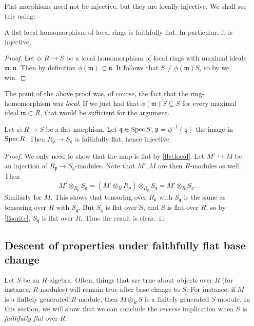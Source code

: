 Flat morphisms need not be injective, but they are locally injective. We shall see this using:
\begin{proposition}  \label{flatlocal}
A flat local homomorphism of local rings is faithfully flat. In particular, it
is injective.
\end{proposition} 
\begin{proof} 
Let $\phi: R \to S$ be a local homomorphism of local rings with maximal ideals
$\mathfrak{m}, \mathfrak{n}$. Then by definition $\phi(\mathfrak{m}) \subset
\mathfrak{n}$. It follows that $S \neq \phi(\mathfrak{m})S$, so by
 we win.
\end{proof} 
The point of the above proof was, of course, the fact that the
ring-homomorphism was \emph{local}. If we just had that $\phi( \mathfrak{m})S
\subsetneq S$ for every maximal ideal $\mathfrak{m} \subset R$, that would be
sufficient for the argument.

\begin{corollary} 
Let $\phi: R \to S$ be a flat morphism. Let $\mathfrak{q} \in \operatorname{Spec} S$,
$\mathfrak{p} = \phi^{-1}(\mathfrak{q})$ the image in $\operatorname{Spec} R$. Then 
$R_{\mathfrak{p}} \to S_{\mathfrak{q}}$ is faithfully flat, hence injective.
\end{corollary} 
\begin{proof} 
We only need to show that the map is flat by \cref{flatlocal}. 
Let $M' \hookrightarrow M$ be an injection of $R_{\mathfrak{p}} \to
S_{\mathfrak{q}}$-modules. Note that $M', M$ are then $R$-modules as well.
Then 
$$M' \otimes_{R_{\mathfrak{p}}} S_{\mathfrak{q}} = (M' \otimes_R
R_{\mathfrak{p}}) \otimes_{R_{\mathfrak{p}}} S_{\mathfrak{q}} = M' \otimes_R
S_{\mathfrak{q}}.$$
Similarly for $M$.
This shows that tensoring over $R_{\mathfrak{p}}$ with $S_{\mathfrak{q}}$ is
the same as tensoring over $R$ with $S_{\mathfrak{q}}$. But $S_{\mathfrak{q}}$
is flat over $S$, and $S$ is flat over $R$, so by \cref{ffsorite},
$S_{\mathfrak{q}}$ is flat over $R$. Thus the result is clear.
\end{proof} 

\subsection{Descent of properties under faithfully flat base change}

Let $S$ be an $R$-algebra. Often, things that are true about objects over $R$
(for instance, $R$-modules) will remain true after base-change to $S$. 
For instance, if $M$ is a finitely generated $R$-module, then $M \otimes_R S$
is a finitely generated $S$-module.
In this section, we will show that we can conclude the \emph{reverse}
implication when $S$ is \emph{faithfully flat} over $R$.

